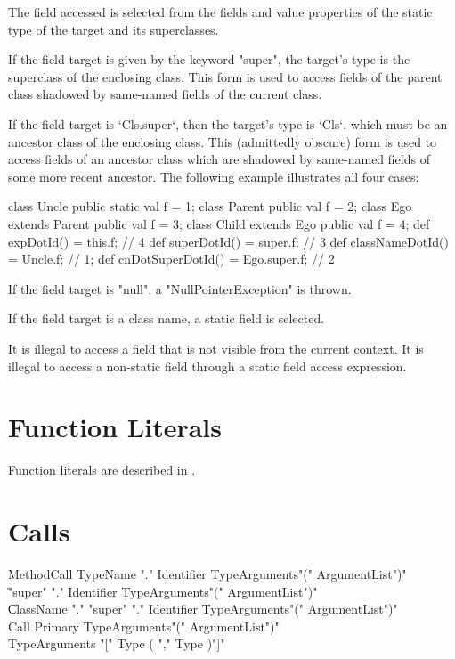 The field accessed is selected from the fields and value properties
of the static type of the target and its superclasses.

If the field target is given by the keyword \xcd"super", the target's type is
the superclass of the enclosing class.  This form is used to access fields of
the parent class shadowed by same-named fields of the current class.

If the field target is \xcd`Cls.super`, then the target's type is \xcd`Cls`,
which must be an ancestor class of the enclosing class.  This (admittedly
obscure) form is used to access fields of an ancestor class which are shadowed
by same-named fields of some more recent ancestor.  The following example
illustrates all four cases:

\begin{xten}
class Uncle {
  public static val f = 1;
}
class Parent {
  public val f = 2;
}
class Ego extends Parent {
  public val f = 3;
  class Child extends Ego {
     public val f = 4;
     def expDotId() = this.f; // 4
     def superDotId() = super.f; // 3
     def classNameDotId() = Uncle.f; // 1;
     def cnDotSuperDotId() = Ego.super.f; // 2
  }
}
\end{xten}
%


If the field target is \xcd"null", a \xcd"NullPointerException"
is thrown.

If the field target is a class name, a static field is selected.

It is illegal to access  a field that is not visible from
the current context.
It is illegal to access a non-static field
through a static field access expression.

\section{Function Literals}
Function literals are described in .

\section{Calls}
\label{Call}
\label{MethodInvocation}
\label{MethodInvocationSubstitution}

\begin{grammar}
MethodCall \: TypeName \xcd"." Identifier TypeArguments\opt \xcd"(" ArgumentList\opt \xcd")" \\
           \| \xcd"super" \xcd"." Identifier TypeArguments\opt \xcd"(" ArgumentList\opt \xcd")" \\
           \| ClassName \xcd"." \xcd"super" \xcd"." Identifier TypeArguments\opt \xcd"(" ArgumentList\opt \xcd")" \\
Call \: Primary TypeArguments\opt \xcd"(" ArgumentList\opt \xcd")" \\
TypeArguments \: \xcd"[" Type ( \xcd"," Type )\star \xcd"]" \\
\end{grammar}

